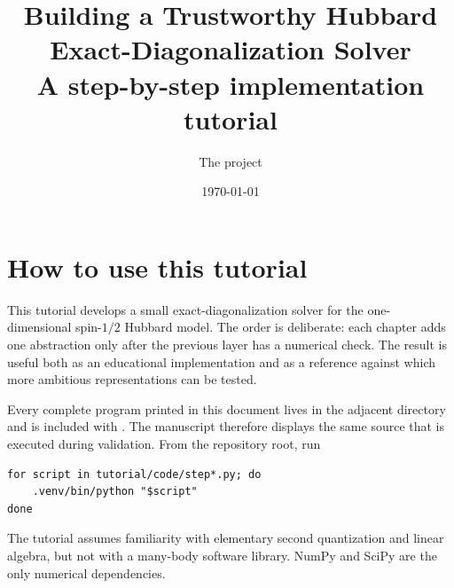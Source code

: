 

\title{Building a Trustworthy Hubbard\\Exact-Diagonalization Solver\\
\large A step-by-step implementation tutorial}
\author{The  project}
\date{\today}



\frontmatter
\hypersetup{pageanchor=false}
\maketitle
\cleardoublepage
\hypersetup{pageanchor=true}
\setcounter{page}{1}

\chapter*{How to use this tutorial}

This tutorial develops a small exact-diagonalization solver for the
one-dimensional spin-$1/2$ Hubbard model.  The order is deliberate: each
chapter adds one abstraction only after the previous layer has a numerical
check.  The result is useful both as an educational implementation and as a
reference against which more ambitious representations can be tested.

Every complete program printed in this document lives in the adjacent
 directory and is included with .  The manuscript therefore displays the same source that is
executed during validation.  From the repository root, run

\begin{verbatim}
for script in tutorial/code/step*.py; do
    .venv/bin/python "$script"
done
\end{verbatim}

The tutorial assumes familiarity with elementary second quantization and
linear algebra, but not with a many-body software library.  NumPy and SciPy are
the only numerical dependencies.

\tableofcontents

\mainmatter











